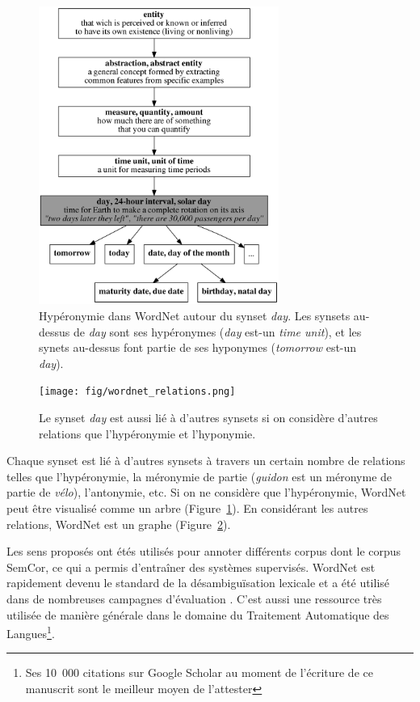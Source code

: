 \begin{figure}[ht]
    \centering
    \includegraphics[width=0.7\textwidth]{fig/wordnet_hypernymy.png}
    \caption{\label{fig:wordnet_hypernymy}Hypéronymie dans WordNet autour du
        synset \emph{day}. Les synsets au-dessus de \emph{day} sont ses hypéronymes
        (\emph{day} est-un \emph{time unit}), et les synets au-dessus font partie de
        ses hyponymes (\emph{tomorrow} est-un \emph{day}).}
\end{figure}

\begin{figure}[ht]
    \centering
    \texttt{[image: fig/wordnet\_relations.png]}
    \caption{\label{fig:wordnet_relations} Le synset \emph{day} est aussi lié à
        d'autres synsets si on considère d'autres relations que l'hypéronymie et
        l'hyponymie.}
\end{figure}

Chaque synset est lié à d'autres synsets à travers un certain nombre de
relations telles que l'hypéronymie, la méronymie de partie (\emph{guidon} est
un méronyme de partie de \emph{vélo}), l'antonymie, etc. Si on ne considère que
l'hypéronymie, WordNet peut être visualisé comme un arbre
(Figure~\ref{fig:wordnet_hypernymy}). En considérant les autres relations,
WordNet est un graphe (Figure~\ref{fig:wordnet_relations}).

Les sens proposés ont étés utilisés pour annoter différents corpus dont le
corpus SemCor, ce qui a permis d'entraîner des systèmes supervisés. WordNet est
rapidement devenu le standard de la désambiguïsation lexicale et a été utilisé
dans de nombreuses campagnes d'évaluation \citep{navigli2009word}. C'est aussi
une ressource très utilisée de manière générale dans le domaine du Traitement
Automatique des Langues\footnote{Ses 10~000 citations sur Google Scholar au
moment de l'écriture de ce manuscrit sont le meilleur moyen de l'attester}.

